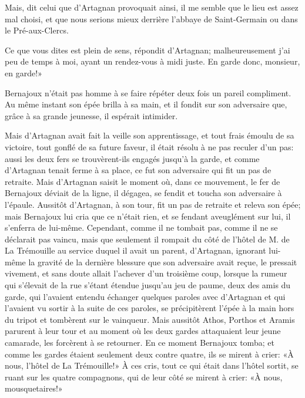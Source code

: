 \speak  Mais, dit celui que d'Artagnan provoquait ainsi, il me semble que le lieu est assez mal choisi, et que nous serions mieux derrière l'abbaye de Saint-Germain ou dans le Pré-aux-Clercs. 

\speak  Ce que vous dites est plein de sens, répondit d'Artagnan; malheureusement j'ai peu de temps à moi, ayant un rendez-vous à midi juste. En garde donc, monsieur, en garde!» 

Bernajoux n'était pas homme à se faire répéter deux fois un pareil compliment. Au même instant son épée brilla à sa main, et il fondit sur son adversaire que, grâce à sa grande jeunesse, il espérait intimider. 

Mais d'Artagnan avait fait la veille son apprentissage, et tout frais émoulu de sa victoire, tout gonflé de sa future faveur, il était résolu à ne pas reculer d'un pas: aussi les deux fers se trouvèrent-ils engagés jusqu'à la garde, et comme d'Artagnan tenait ferme à sa place, ce fut son adversaire qui fit un pas de retraite. Mais d'Artagnan saisit le moment où, dans ce mouvement, le fer de Bernajoux déviait de la ligne, il dégagea, se fendit et toucha son adversaire à l'épaule. Aussitôt d'Artagnan, à son tour, fit un pas de retraite et releva son épée; mais Bernajoux lui cria que ce n'était rien, et se fendant aveuglément sur lui, il s'enferra de lui-même. Cependant, comme il ne tombait pas, comme il ne se déclarait pas vaincu, mais que seulement il rompait du côté de l'hôtel de M. de La Trémouille au service duquel il avait un parent, d'Artagnan, ignorant lui-même la gravité de la dernière blessure que son adversaire avait reçue, le pressait vivement, et sans doute allait l'achever d'un troisième coup, lorsque la rumeur qui s'élevait de la rue s'étant étendue jusqu'au jeu de paume, deux des amis du garde, qui l'avaient entendu échanger quelques paroles avec d'Artagnan et qui l'avaient vu sortir à la suite de ces paroles, se précipitèrent l'épée à la main hors du tripot et tombèrent sur le vainqueur. Mais aussitôt Athos, Porthos et Aramis parurent à leur tour et au moment où les deux gardes attaquaient leur jeune camarade, les forcèrent à se retourner. En ce moment Bernajoux tomba; et comme les gardes étaient seulement deux contre quatre, ils se mirent à crier: «À nous, l'hôtel de La Trémouille!» À ces cris, tout ce qui était dans l'hôtel sortit, se ruant sur les quatre compagnons, qui de leur côté se mirent à crier: «À nous, mousquetaires!» 

